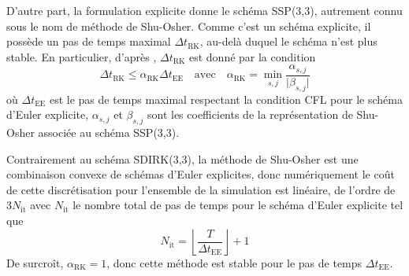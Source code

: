 \documentclass[11pt, a4paper, oneside]{report}
\begin{document}
D'autre part, la formulation explicite donne le schéma SSP(3,3), autrement connu sous le nom de méthode de Shu-Osher. Comme c'est un schéma explicite, il possède un pas de temps maximal $\Delta t_\text{RK}$, au-delà duquel le schéma n'est plus stable. En particulier, d'après \cite{gottlieb2005high}, $\Delta t_\text{RK}$ est donné par la condition
\begin{equation} \label{eq:Relation_RK_EE}
    \Delta t_\text{RK} \leq \alpha_\text{RK} \Delta t_\text{EE} \quad \text{avec} \quad \alpha_\text{RK} = \min_{s, j} \frac{\alpha_{s, j}}{\lvert \beta_{s, j} \rvert}
\end{equation}
où $\Delta t_\text{EE}$ est le pas de temps maximal respectant la condition CFL pour le schéma d'Euler explicite, $\alpha_{s, j}$ et $\beta_{s, j}$ sont les coefficients de la représentation de Shu-Osher associée au schéma SSP(3,3). 

Contrairement au schéma SDIRK(3,3), la méthode de Shu-Osher est une combinaison convexe de schémas d'Euler explicites, donc numériquement le coût de cette discrétisation pour l'ensemble de la simulation est linéaire, de l'ordre de $3N_\text{it}$ avec $N_\text{it}$ le nombre total de pas de temps pour le schéma d'Euler explicite tel que
\begin{equation}
    N_\text{it} = \left\lfloor \frac{T}{\Delta t_\text{EE}} \right\rfloor + 1
\end{equation}
De surcroît, $\alpha_\text{RK}= 1$, donc cette méthode est stable pour le pas de temps $\Delta t_\text{EE}$. \\
\end{document}
